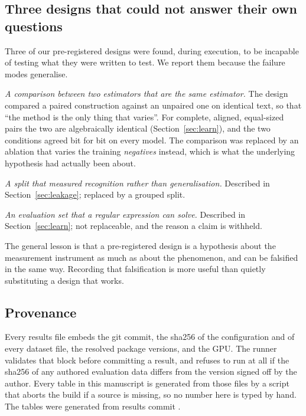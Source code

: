 \subsection{Three designs that could not answer their own questions}
\label{sec:selfdefeating}

Three of our pre-registered designs were found, during execution, to be incapable of testing what they were written to
test. We report them because the failure modes generalise.

\emph{A comparison between two estimators that are the same estimator.} The design compared a paired construction
against an unpaired one on identical text, so that ``the method is the only thing that varies''. For complete,
aligned, equal-sized pairs the two are algebraically identical (Section~\ref{sec:learn}), and the two conditions agreed
bit for bit on every model. The comparison was replaced by an ablation that varies the training \emph{negatives}
instead, which is what the underlying hypothesis had actually been about.

\emph{A split that measured recognition rather than generalisation.} Described in Section~\ref{sec:leakage}; replaced
by a grouped split.

\emph{An evaluation set that a regular expression can solve.} Described in Section~\ref{sec:learn}; not replaceable,
and the reason a claim is withheld.

The general lesson is that a pre-registered design is a hypothesis about the measurement instrument as much as about
the phenomenon, and can be falsified in the same way. Recording that falsification is more useful than quietly
substituting a design that works.

\subsection{Provenance}
\label{sec:provenance}

Every results file embeds the git commit, the sha256 of the configuration and of every dataset file, the resolved
package versions, and the GPU. The runner validates that block before committing a result, and refuses to run at all
if the sha256 of any authored evaluation data differs from the version signed off by the author. Every table in this
manuscript is generated from those files by a script that aborts the build if a source is missing, so no number here
is typed by hand. The tables were generated from results commit \texttt{\resultscommit}.
